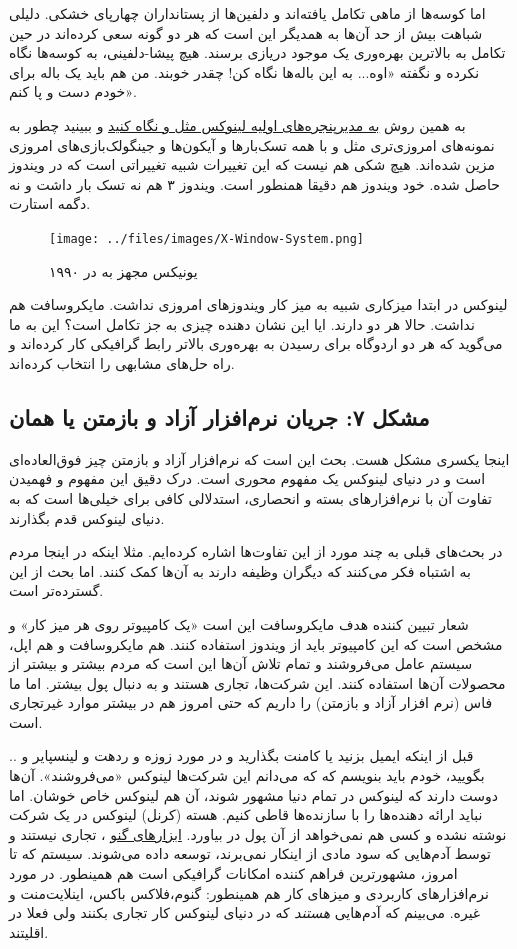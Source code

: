 اما کوسه‌ها از ماهی تکامل یافته‌اند و دلفین‌ها از پستانداران چهارپای خشکی. دلیلی شباهت بیش از حد آن‌ها به همدیگر این است که هر دو گونه سعی کرده‌اند در حین تکامل به بالاترین بهره‌وری یک موجود دریازی برسند. هیچ پیشا-دلفینی، به کوسه‌ها نگاه نکرده و نگفته «اوه... به این باله‌ها نگاه کن! چقدر خوبند. من هم باید یک باله برای خودم دست و پا کنم».

به همین روش
\href{http://xwinman.org/}{به مدیرپنجره‌های اولیه لینوکس مثل 
 و 
 نگاه کنید}
و ببینید چطور به نمونه‌های امروزی‌تری مثل 
 و 
 با همه تسک‌بارها و آیکون‌ها و جینگولک‌بازی‌های امروزی مزین شده‌اند. هیچ شکی هم نیست که این تغییرات شبیه تغییراتی است که در ویندوز حاصل شده. خود ویندوز هم دقیقا همنطور است. ویندوز ۳ هم نه تسک بار داشت و نه دگمه استارت.
\begin{figure}[H]
\texttt{[image: ../files/images/X-Window-System.png]}
\caption*{یونیکس مجهز به 
	در ۱۹۹۰}
\end{figure}


لینوکس در ابتدا میزکاری شبیه به میز کار ویندوزهای امروزی نداشت. مایکروسافت هم نداشت. حالا هر دو دارند. ایا این نشان دهنده چیزی به جز تکامل است؟‌
این به ما می‌گوید که هر دو اردوگاه برای رسیدن به بهره‌وری بالاتر رابط گرافیکی کار کرده‌اند و راه حل‌های مشابهی را انتخاب کرده‌اند.
\subsection*{مشکل ۷: جریان نرم‌افزار آزاد و بازمتن یا همان 
}
اینجا یکسری مشکل هست. بحث این است که نرم‌افزار آزاد و بازمتن چیز فوق‌العاده‌ای است و در دنیای لینوکس یک مفهوم محوری است. درک دقیق این مفهوم و فهمیدن تفاوت آن با نرم‌افزارهای بسته و انحصاری، استدلالی کافی برای خیلی‌ها است که به دنیای لینوکس قدم بگذارند.

در بحث‌های قبلی به چند مورد از این تفاوت‌ها اشاره کرده‌ایم. مثلا اینکه در اینجا مردم به اشتباه فکر می‌کنند که دیگران وظیفه دارند به آن‌ها کمک کنند. اما بحث از این گسترده‌تر است.

شعار تبیین کننده هدف مایکروسافت این است «یک کامپیوتر روی هر میز کار» و مشخص است که این کامپیوتر باید از ویندوز استفاده کنند. هم مایکروسافت و هم اپل، سیستم عامل می‌فروشند و تمام تلاش آن‌ها این است که مردم بیشتر و بیشتر از محصولات آن‌ها استفاده کنند. این شرکت‌ها، تجاری هستند و به دنبال پول بیشتر.
اما ما فاس (نرم افزار آزاد و بازمتن) را داریم که حتی امروز هم در بیشتر موارد غیرتجاری است.

قبل از اینکه ایمیل بزنید یا کامنت بگذارید و در مورد زوزه و ردهت و لینسپایر و .. بگویید، خودم باید بنویسم که که می‌دانم این شرکت‌ها لینوکس «می‌فروشند». آن‌ها دوست دارند که لینوکس در تمام دنیا مشهور شوند، آن هم لینوکس خاص خوشان. اما نباید ارائه دهنده‌ها را با سازنده‌ها قاطی کنیم. هسته (کرنل) لینوکس در یک شرکت نوشته نشده و کسی هم نمی‌خواهد از آن پول در بیاورد.
\href{http://www.gnu.org/home.fa.html}{ابزارهای گنو}
، تجاری نیستند و توسط آدم‌هایی که سود مادی از اینکار نمی‌برند، توسعه داده می‌شوند. سیستم 
 که تا امروز، مشهورترین فراهم کننده امکانات گرافیکی است هم همینطور. در مورد نرم‌افزارهای کاربردی و میزهای کار هم همینطور: گنوم،‌فلاکس باکس، اینلایت‌منت و غیره. می‌بینم که آدم‌هایی
\emph{هستند}
که در دنیای لینوکس کار تجاری بکنند ولی فعلا در اقلیتند.

